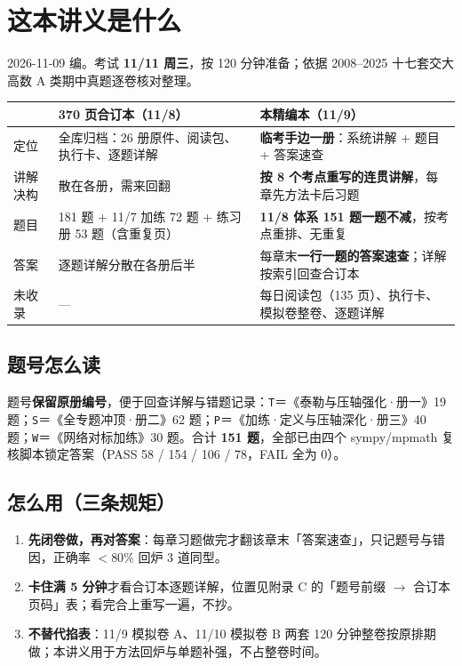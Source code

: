 
\section*{这本讲义是什么}
\vspace{-2mm}
{\small 2026-11-09 编。考试 \textbf{11/11 周三}，按 120 分钟准备；依据 2008--2025 十七套交大高数 A 类期中真题逐卷核对整理。}

\begin{center}
\begin{tabular}{@{}p{3.0cm}p{5.6cm}p{6.6cm}@{}}
\toprule
 & \textbf{370 页合订本（11/8）} & \textbf{本精编本（11/9）} \\
\midrule
定位 & 全库归档：26 册原件、阅读包、执行卡、逐题详解 & \textbf{临考手边一册}：系统讲解 + 题目 + 答案速查 \\
讲解决构 & 散在各册，需来回翻 & \textbf{按 8 个考点重写的连贯讲解}，每章先方法卡后习题 \\
题目 & 181 题 + 11/7 加练 72 题 + 练习册 53 题（含重复页） & \textbf{11/8 体系 151 题一题不减}，按考点重排、无重复 \\
答案 & 逐题详解分散在各册后半 & 每章末\textbf{一行一题的答案速查}；详解按索引回查合订本 \\
未收录 & — & 每日阅读包（135 页）、执行卡、模拟卷整卷、逐题详解 \\
\bottomrule
\end{tabular}
\end{center}

\subsection*{题号怎么读}
题号\textbf{保留原册编号}，便于回查详解与错题记录：\texttt{T}＝《泰勒与压轴强化·册一》19 题；\texttt{S}＝《全专题冲顶·册二》62 题；\texttt{P}＝《加练·定义与压轴深化·册三》40 题；\texttt{W}＝《网络对标加练》30 题。合计 \textbf{151 题}，全部已由四个 sympy/mpmath 复核脚本锁定答案（PASS 58 / 154 / 106 / 78，FAIL 全为 0）。

\subsection*{怎么用（三条规矩）}
\begin{enumerate}
\item \textbf{先闭卷做，再对答案}：每章习题做完才翻该章末「答案速查」，只记题号与错因，正确率 $<80\%$ 回炉 3 道同型。
\item \textbf{卡住满 5 分钟}才看合订本逐题详解，位置见附录 C 的「题号前缀 $\to$ 合订本页码」表；看完合上重写一遍，不抄。
\item \textbf{不替代掐表}：11/9 模拟卷 A、11/10 模拟卷 B 两套 120 分钟整卷按原排期做；本讲义用于方法回炉与单题补强，不占整卷时间。
\end{enumerate}

